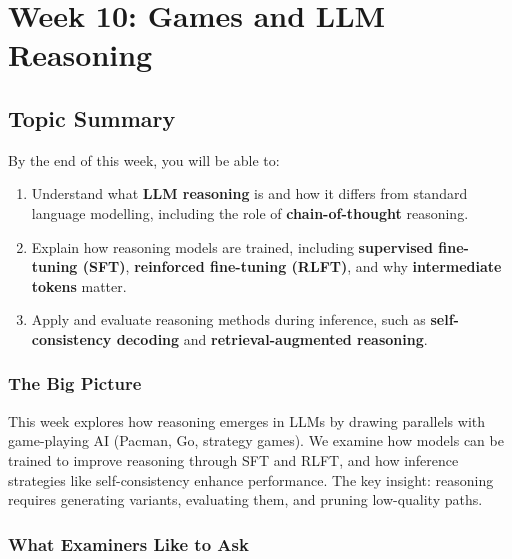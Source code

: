 \section{Week 10: Games and LLM Reasoning}

\subsection{Topic Summary}

\begin{keybox}
By the end of this week, you will be able to:
\begin{enumerate}
  \item Understand what \textbf{LLM reasoning} is and how it differs from standard language modelling, including the role of \textbf{chain-of-thought} reasoning.
  \item Explain how reasoning models are trained, including \textbf{supervised fine-tuning (SFT)}, \textbf{reinforced fine-tuning (RLFT)}, and why \textbf{intermediate tokens} matter.
  \item Apply and evaluate reasoning methods during inference, such as \textbf{self-consistency decoding} and \textbf{retrieval-augmented reasoning}.
\end{enumerate}
\end{keybox}

\separator

\subsubsection*{The Big Picture}

This week explores how reasoning emerges in LLMs by drawing parallels with game-playing AI (Pacman, Go, strategy games). We examine how models can be trained to improve reasoning through SFT and RLFT, and how inference strategies like self-consistency enhance performance. The key insight: reasoning requires generating variants, evaluating them, and pruning low-quality paths.

\separator

\subsubsection*{What Examiners Like to Ask}

